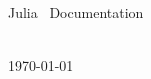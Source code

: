
\newcommand{\scaleFactor}{0.4}
\begin{titlingpage}
    \BgThispage
    \vspace*{2.5cm}\noindent

    \begin{center}
        \textcolor{black}{ \MainHeading  \DocMainTitle } 
        \vfill
        
         
        \\[1.5cm]
        { \SecondaryHeading Julia \JuliaVersion\ Documentation } 
        \vfill
        
        { \huge  \DocAuthors }
        \\[0.5cm]
        { \huge \today }
    \end{center} 
\end{titlingpage}
\restoregeometry
